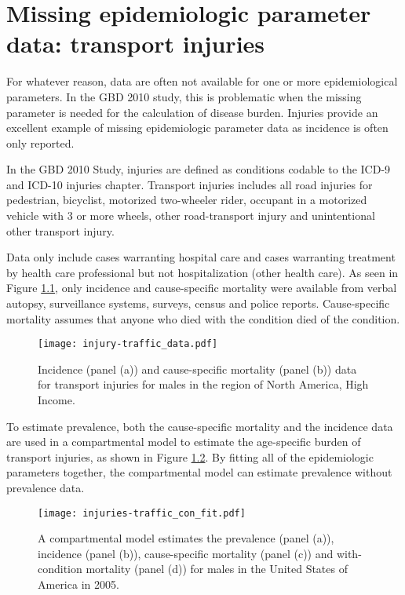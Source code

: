 \chapter{Missing epidemiologic parameter data: transport injuries}
\label{applications-double_dismod}

For whatever reason, data are often not available for one or more
epidemiological parameters.  In the GBD 2010 study, this is
problematic when the missing parameter is needed for the calculation
of disease burden.  Injuries provide an excellent example of missing
epidemiologic parameter data as incidence is often only reported.

In the GBD 2010 Study, injuries are defined as conditions codable to
the ICD-9 and ICD-10 injuries chapter.  Transport injuries includes
all road injuries for pedestrian, bicyclist, motorized two-wheeler
rider, occupant in a motorized vehicle with 3 or more wheels, other
road-transport injury and unintentional other transport injury.

Data only include cases warranting hospital care and cases warranting
treatment by health care professional but not hospitalization (other
health care).  As seen in Figure \ref{fig:app-injury traffic data},
only incidence and cause-specific mortality were available from verbal
autopsy, surveillance systems, surveys, census and police reports.
Cause-specific mortality assumes that anyone who died with the
condition died of the condition.

    \begin{figure}[h]
        \begin{center}
            \texttt{[image: injury-traffic\_data.pdf]}
            \caption{Incidence (panel (a)) and cause-specific
              mortality (panel (b)) data for transport injuries for
              males in the region of North America, High Income.}
            \label{fig:app-injury traffic data}
        \end{center}
    \end{figure}

To estimate prevalence, both the cause-specific mortality and the
incidence data are used in a compartmental model to estimate the
age-specific burden of transport injuries, as shown in Figure
\ref{fig:app-injury traffic fit}.  By fitting all of the epidemiologic
parameters together, the compartmental model can estimate prevalence
without prevalence data.

    \begin{figure}[h]
        \begin{center}
            \texttt{[image: injuries-traffic\_con\_fit.pdf]}
            \caption{A compartmental model estimates the prevalence
              (panel (a)), incidence (panel (b)), cause-specific
              mortality (panel (c)) and with-condition mortality
              (panel (d)) for males in the United States of America in
              2005.}
            \label{fig:app-injury traffic fit}
        \end{center}
    \end{figure}

